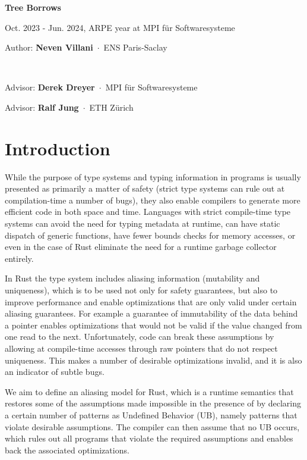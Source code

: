 \documentclass[a4paper,11pt]{article}
\newcommand{\myaff}[1]{\,$\cdot$\, {\small #1}\par\smallskip}
\newcommand{\fakeparagraph}[2]{\par\noindent\textbf{#1}\hspace{1em}#2}
\theoremstyle{plain}
\theoremstyle{definition}
\theoremstyle{remark}
\newcommand{\tcode}[1]{\rstinline{#1}}
\newenvironment{myabstract}
{\list{}{\listparindent 1.5em%
        \itemindent    \listparindent
        \leftmargin    0cm
        \rightmargin   0cm
        \parsep        0pt}%
    \item\relax}
{\endlist}
\newenvironment{mycover}
{\list{}{\listparindent 0pt
        \itemindent    \listparindent
        \leftmargin    0cm
        \rightmargin   0cm
        \parsep        0pt}%
    \raggedright
    \item\relax}
{\endlist}
\begin{document}
\begin{mycover}
{\huge\bfseries\boldmath Tree Borrows\par}
{Oct. 2023 - Jun. 2024, ARPE year at MPI f\"ur Softwaresysteme}
\bigskip
\bigskip
\bigskip


Author: \textbf{Neven Villani}
\myaff{ENS Paris-Saclay}

~\newline

Advisor: \textbf{Derek Dreyer}
\myaff{MPI f\"ur Softwaresysteme}


Advisor: \textbf{Ralf Jung}
\myaff{ETH Zürich}


\end{mycover}
\medskip


\section{Introduction}

While the purpose of type systems and typing information in programs is usually
presented as primarily a matter of safety (strict type systems can rule out
at compilation-time a number of bugs), they also enable compilers to generate
more efficient code in both space and time. Languages with strict compile-time
type systems can avoid the need for typing metadata at runtime, can have static
dispatch of generic functions, have fewer bounds checks for memory accesses,
or even in the case of Rust eliminate the need for a runtime garbage collector entirely.

In Rust the type system includes aliasing information (mutability and uniqueness),
which is to be used not only for safety guarantees, but also to improve
performance and enable optimizations that are only valid under certain aliasing
guarantees. For example a guarantee of immutability of the data behind a pointer
enables optimizations that would not be valid if the value changed from one read
to the next.
Unfortunately, \tcode{unsafe} code can break these assumptions by allowing at
compile-time accesses through raw pointers that do not respect uniqueness.
This makes a number of desirable optimizations invalid, and it is also an
indicator of subtle bugs.

We aim to define an aliasing model for Rust, which is a runtime semantics
that restores some of the assumptions made impossible in the presence of \tcode{unsafe}
by declaring a certain number of patterns as Undefined Behavior (UB), namely
patterns that violate desirable assumptions. The compiler can then assume
that no UB occurs, which rules out all programs that violate the required
assumptions and enables back the associated optimizations.
\end{document}
